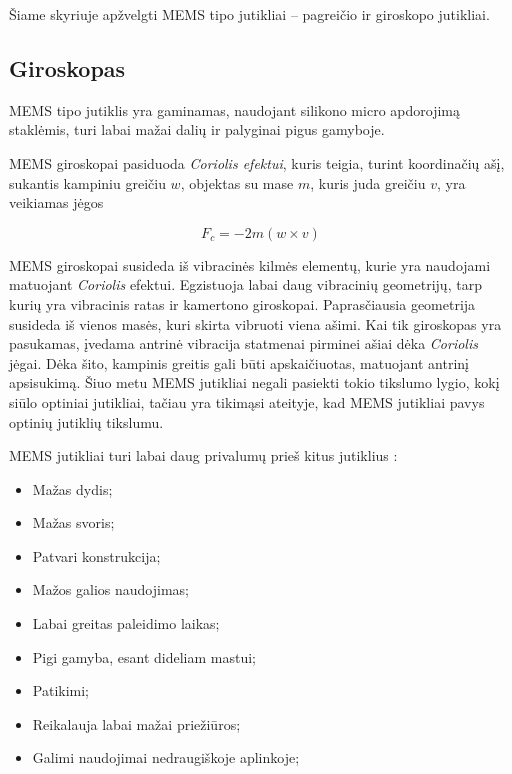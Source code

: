 
Šiame skyriuje apžvelgti MEMS tipo jutikliai -- pagreičio ir giroskopo jutikliai.

\subsection{Giroskopas}

MEMS tipo jutiklis \cite{perlmutter2012high} yra gaminamas, naudojant silikono micro apdorojimą staklėmis, turi labai mažai dalių ir palyginai pigus gamyboje.

MEMS giroskopai pasiduoda \textit{Coriolis efektui}, kuris teigia, turint koordinačių ašį, sukantis kampiniu greičiu $w$, objektas su mase $m$, kuris juda greičiu $v$, yra veikiamas jėgos

\begin{equation}
    F_c = -2m(w \times v)
\end{equation}

MEMS giroskopai susideda iš vibracinės kilmės elementų, kurie yra naudojami matuojant \textit{Coriolis} efektui. Egzistuoja labai daug vibracinių geometrijų, tarp kurių yra vibracinis ratas ir kamertono giroskopai. Paprasčiausia geometrija susideda iš vienos masės, kuri skirta vibruoti viena ašimi. Kai tik giroskopas yra pasukamas, įvedama antrinė vibracija statmenai pirminei ašiai dėka \textit{Coriolis} jėgai. Dėka šito, kampinis greitis gali būti apskaičiuotas, matuojant antrinį apsisukimą. Šiuo metu MEMS jutikliai negali pasiekti tokio tikslumo lygio, kokį siūlo optiniai jutikliai, tačiau yra tikimąsi ateityje, kad MEMS jutikliai pavys optinių jutiklių tikslumu.

MEMS jutikliai turi labai daug privalumų prieš kitus jutiklius \cite{titterton2004strapdown}:

\begin{itemize}
    \item Mažas dydis;
    \item Mažas svoris;
    \item Patvari konstrukcija;
    \item Mažos galios naudojimas;
    \item Labai greitas paleidimo laikas;
    \item Pigi gamyba, esant dideliam mastui;
    \item Patikimi;
    \item Reikalauja labai mažai priežiūros;
    \item Galimi naudojimai nedraugiškoje aplinkoje;
\end{itemize}

